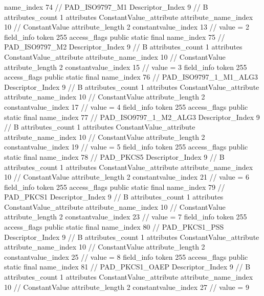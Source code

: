 {{{{{				name_index	74		// PAD_ISO9797_M1
				Descriptor_Index	9		// B
				attributes_count	1
				attributes {
				ConstantValue_attribute {
					attribute_name_index	10		// ConstantValue
					attribute_length	2
					constantvalue_index	13		// value = 2
				}
				}
			}
			field_info {
				token	255
				access_flags	public static final
				name_index	75		// PAD_ISO9797_M2
				Descriptor_Index	9		// B
				attributes_count	1
				attributes {
				ConstantValue_attribute {
					attribute_name_index	10		// ConstantValue
					attribute_length	2
					constantvalue_index	15		// value = 3
				}
				}
			}
			field_info {
				token	255
				access_flags	public static final
				name_index	76		// PAD_ISO9797_1_M1_ALG3
				Descriptor_Index	9		// B
				attributes_count	1
				attributes {
				ConstantValue_attribute {
					attribute_name_index	10		// ConstantValue
					attribute_length	2
					constantvalue_index	17		// value = 4
				}
				}
			}
			field_info {
				token	255
				access_flags	public static final
				name_index	77		// PAD_ISO9797_1_M2_ALG3
				Descriptor_Index	9		// B
				attributes_count	1
				attributes {
				ConstantValue_attribute {
					attribute_name_index	10		// ConstantValue
					attribute_length	2
					constantvalue_index	19		// value = 5
				}
				}
			}
			field_info {
				token	255
				access_flags	public static final
				name_index	78		// PAD_PKCS5
				Descriptor_Index	9		// B
				attributes_count	1
				attributes {
				ConstantValue_attribute {
					attribute_name_index	10		// ConstantValue
					attribute_length	2
					constantvalue_index	21		// value = 6
				}
				}
			}
			field_info {
				token	255
				access_flags	public static final
				name_index	79		// PAD_PKCS1
				Descriptor_Index	9		// B
				attributes_count	1
				attributes {
				ConstantValue_attribute {
					attribute_name_index	10		// ConstantValue
					attribute_length	2
					constantvalue_index	23		// value = 7
				}
				}
			}
			field_info {
				token	255
				access_flags	public static final
				name_index	80		// PAD_PKCS1_PSS
				Descriptor_Index	9		// B
				attributes_count	1
				attributes {
				ConstantValue_attribute {
					attribute_name_index	10		// ConstantValue
					attribute_length	2
					constantvalue_index	25		// value = 8
				}
				}
			}
			field_info {
				token	255
				access_flags	public static final
				name_index	81		// PAD_PKCS1_OAEP
				Descriptor_Index	9		// B
				attributes_count	1
				attributes {
				ConstantValue_attribute {
					attribute_name_index	10		// ConstantValue
					attribute_length	2
					constantvalue_index	27		// value = 9
				}
				}
			}
}}}}
